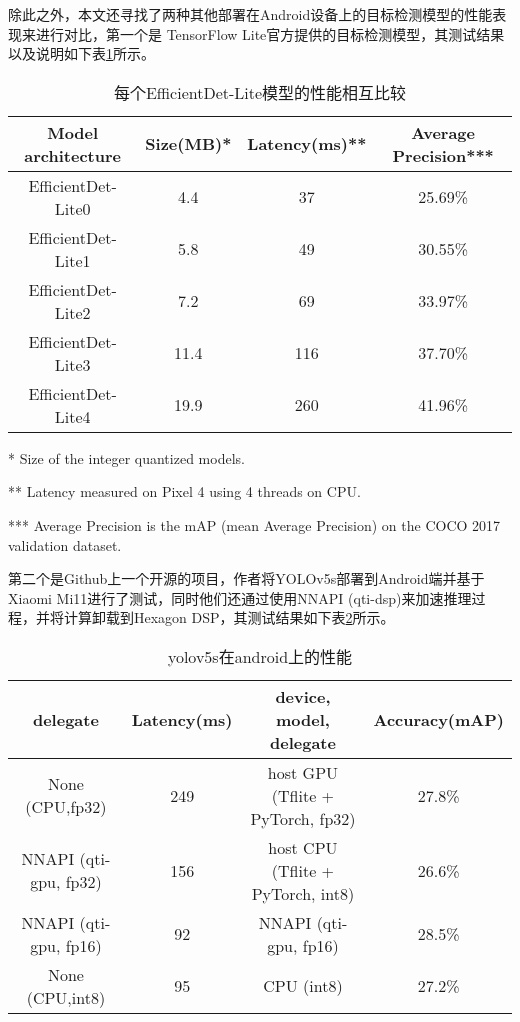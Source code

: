 \documentclass{ctexart}
\numberwithin{equation}{section}%
\numberwithin{figure}{section}%
\numberwithin{table}{section}%
\begin{document}
	除此之外，本文还寻找了两种其他部署在Android设备上的目标检测模型的性能表现来进行对比，第一个是 TensorFlow Lite官方提供的目标检测模型，其测试结果以及说明如下表\ref{b3}所示。
	
	\begin{table}[h]
	\centering
	\caption{每个EfficientDet-Lite模型的性能相互比较}\label{b3}
	\begin{tabular}{c|c|c|c}
		\hline
	Model architecture	&Size(MB)*	&Latency(ms)**	&Average Precision***\\
	\hline
	EfficientDet-Lite0	&4.4	&37	&25.69\%\\
	EfficientDet-Lite1	&5.8	&49	&30.55\%\\
	EfficientDet-Lite2	&7.2	&69	&33.97\%\\
	EfficientDet-Lite3	&11.4	&116	&37.70\%\\
	EfficientDet-Lite4	&19.9	&260	&41.96\%\\
		\hline
	\end{tabular}
	\end{table}

	* Size of the integer quantized models.
	
	** Latency measured on Pixel 4 using 4 threads on CPU.
	
	*** Average Precision is the mAP (mean Average Precision) on the COCO 2017 validation dataset.
	
	第二个是Github上一个开源的项目，作者将YOLOv5s部署到Android端并基于Xiaomi Mi11进行了测试，同时他们还通过使用NNAPI (qti-dsp)来加速推理过程，并将计算卸载到Hexagon DSP，其测试结果如下表\ref{b4}所示。
	
	\begin{table}[h]
		\centering
		\caption{yolov5s在android上的性能}\label{b4}
		\begin{tabular}{|c|c||c|c|}
			\hline
			delegate&  Latency(ms) & device, model, delegate &Accuracy(mAP) \\
			\hline 
			None (CPU,fp32) & 249 & host GPU (Tflite + PyTorch, fp32) & 27.8\%	 \\
			\hline
			NNAPI (qti-gpu, fp32) &  156	&host CPU (Tflite + PyTorch, int8) &  26.6\%	 \\
			\hline
			NNAPI (qti-gpu, fp16) &  92	& NNAPI (qti-gpu, fp16) & 28.5\% \\
			\hline
			None (CPU,int8) &  95	& CPU (int8) &  27.2\% \\
			\hline
		\end{tabular}
	\end{table}
	
\end{document}
